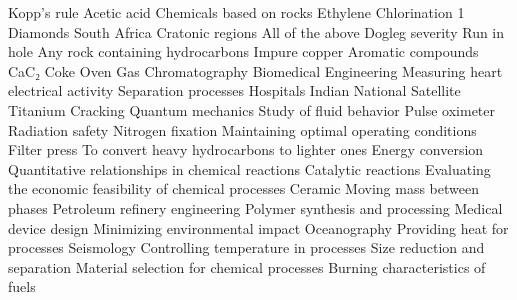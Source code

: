 \answerkey
{} Kopp's rule
 Acetic acid
 Chemicals based on rocks
 Ethylene
 Chlorination
 1%
 Diamonds
 South Africa
 Cratonic regions
 All of the above
 Dogleg severity
 Run in hole
 Any rock containing hydrocarbons
 Impure copper
 Aromatic compounds
 CaC₂
 Coke Oven Gas
 Chromatography
 Biomedical Engineering
 Measuring heart electrical activity
 Separation processes
 Hospitals
 Indian National Satellite
 Titanium
 Cracking
 Quantum mechanics
 Study of fluid behavior
 Pulse oximeter
 Radiation safety
 Nitrogen fixation
 Maintaining optimal operating conditions
 Filter press
 To convert heavy hydrocarbons to lighter ones
 Energy conversion
 Quantitative relationships in chemical reactions
 Catalytic reactions
 Evaluating the economic feasibility of chemical processes
 Ceramic
 Moving mass between phases
 Petroleum refinery engineering
 Polymer synthesis and processing
 Medical device design
 Minimizing environmental impact
 Oceanography
 Providing heat for processes
 Seismology
 Controlling temperature in processes
 Size reduction and separation
 Material selection for chemical processes
 Burning characteristics of fuels
\endanswerkey